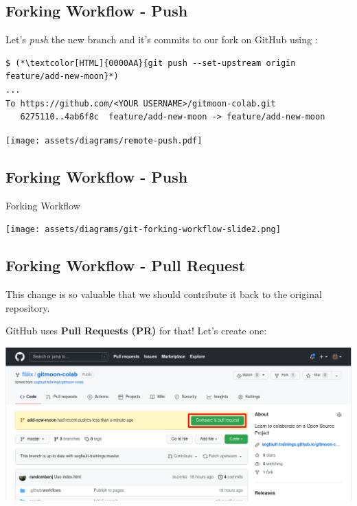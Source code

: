 \subsection{Forking Workflow - Push}
\begin{frame}[fragile]
  \subslidetitle

  Let's \textit{push} the new branch and it's commits to our fork on GitHub using :

  \begin{lstlisting}
$ (*\textcolor[HTML]{0000AA}{git push --set-upstream origin feature/add-new-moon}*)
...
To https://github.com/<YOUR USERNAME>/gitmoon-colab.git
   6275110..4ab6f8c  feature/add-new-moon -> feature/add-new-moon
\end{lstlisting}

  \centerline{\texttt{[image: assets/diagrams/remote-push.pdf]}}

\end{frame}

\subsection{Forking Workflow - Push}
\begin{frame}[fragile]
  \subslidetitle
  Forking Workflow
  \centerline{\texttt{[image: assets/diagrams/git-forking-workflow-slide2.png]}}

\end{frame}

\subsection{Forking Workflow - Pull Request}
\begin{frame}[fragile]
  \subslidetitle

  This change is so valuable that we should contribute it back to the original repository.

  \vspace{1em}
    GitHub uses \textbf{Pull Requests (PR)} for that! Let's create one:

  \vspace{1em}
  \centerline{\includegraphics[width=\textwidth]{../assets/images/github-pull-request-create.png}}

\end{frame}

